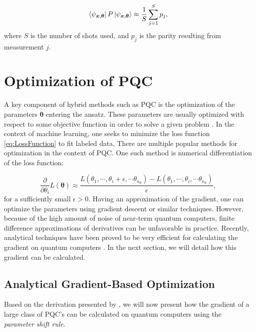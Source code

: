 \begin{equation}
    \bra{\psi_{\boldsymbol{x},\boldsymbol{\theta}}}P 
    \ket{\psi_{\boldsymbol{x},\boldsymbol{\theta}}}
    \approx
    \frac{1}{S} \sum_{j=1}^S p_j,
\end{equation}
where $S$ is the number of shots used, and $p_j$ is the parity resulting from measurement $j$.


\section{Optimization of PQC}\label{sec:OptPQC}
A key component of hybrid methods such as PQC is the optimization of the parameters $\boldsymbol{\theta}$ entering the ansatz. These parameters are usually optimized with respect to some objective function in order to solve a given problem \cite{Benedetti_2019}. In the context of machine learning, one seeks to minimize the loss function \cref{eq:LossFunction} to fit labeled data. There are multiple popular methods for optimization in the context of PQC. One such method is numerical differentiation of the loss function:

\begin{equation}
    \frac{\partial}{\partial \theta_i} L(\boldsymbol{\theta}) 
    \approx \frac{L(\theta_1, \cdots, \theta_i + \epsilon, \cdots \theta_{n_{\theta}}) - L(\theta_1, \cdots, \theta_i, \cdots \theta_{n_{\theta}})}{\epsilon},
\end{equation}
for a sufficiently small $\epsilon>0$. Having an approximation of the gradient, one can optimize the parameters using gradient descent or similar techniques. However, because of the high amount of noise of near-term quantum computers, finite difference approximations of derivatives can be unfavorable in practice. Recently, analytical techniques have been proved to be very efficient for calculating the gradient on quantum computers \cite{abbas2020power, Benedetti_2019}. In the next section, we will detail how this gradient can be calculated. 

\subsection{Analytical Gradient-Based Optimization}\label{sec:AnalyticalGrad}
Based on the derivation presented by \cite{Schuld_2019}, we will now present how the gradient of a large class of PQC's can be calculated on quantum computers using the \emph{parameter shift rule}.

